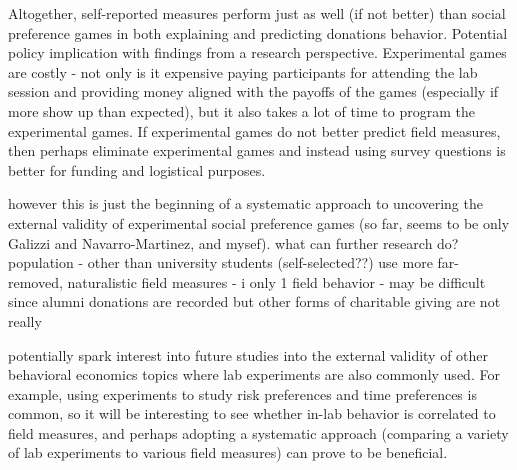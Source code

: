 \documentclass[12pt]{article}
\begin{document}
Altogether, self-reported measures perform just as well (if not better) than social preference games in both explaining and predicting donations behavior. 
Potential policy implication with findings from a research perspective. Experimental games are costly - not only is it expensive paying participants for attending the lab session and providing money aligned with the payoffs of the games (especially if more show up than expected), but it also takes a lot of time to program the experimental games. If experimental games do not better predict field measures, then perhaps eliminate experimental games and instead using survey questions is better for funding and logistical purposes. 

however this is just the beginning of a systematic approach to uncovering the external validity of experimental social preference games (so far, seems to be only Galizzi and Navarro-Martinez, and mysef). what can further research do?
population - other than university students (self-selected??)
use more far-removed, naturalistic field measures - i only 1 field behavior - may be difficult since alumni donations are recorded but other forms of charitable giving are not really

potentially spark interest into future studies into the external validity of other behavioral economics topics where lab experiments are also commonly used. For example, using experiments to study risk preferences and time preferences is common, so it will be interesting to see whether in-lab behavior is correlated to field measures, and perhaps adopting a systematic approach (comparing a variety of lab experiments to various field measures) can prove to be beneficial.

\newpage

%
\end{document}
